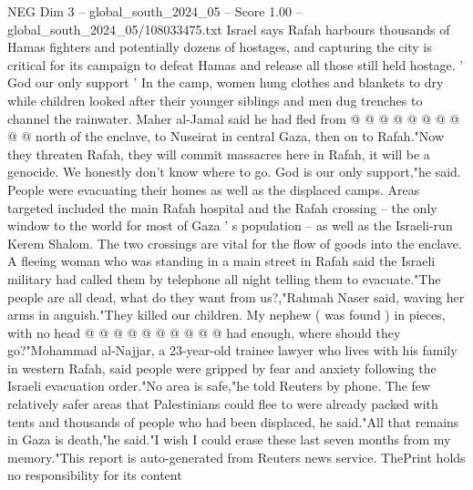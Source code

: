 \begin{textsample}{NEG Dim 3 – global\_south\_2024\_05 – Score 1.00 – global\_south\_2024\_05/108033475.txt}
Israel says Rafah harbours thousands of Hamas fighters and potentially dozens of hostages, and capturing the city is critical for its campaign to defeat Hamas and release all those still held hostage. ' God our only support ' In the camp, women hung clothes and blankets to dry while children looked after their younger siblings and men dug trenches to channel the rainwater.
Maher al-Jamal said he had fled from @ @ @ @ @ @ @ @ @ @ north of the enclave, to Nuseirat in central Gaza, then on to Rafah."Now they threaten Rafah, they will commit massacres here in Rafah, it will be a genocide.
We honestly don't know where to go.
God is our only support,"he said.
People were evacuating their homes as well as the displaced camps.
Areas targeted included the main Rafah hospital and the Rafah crossing -- the only window to the world for most of Gaza ' s population -- as well as the Israeli-run Kerem Shalom.
The two crossings are vital for the flow of goods into the enclave.
A fleeing woman who was standing in a main street in Rafah said the Israeli military had called them by telephone all night telling them to evacuate."The people are all dead, what do they want from us?,"Rahmah Naser said, waving her arms in anguish."They killed our children.
My nephew ( was found ) in pieces, with no head @ @ @ @ @ @ @ @ @ @ had enough, where should they go?"Mohammad al-Najjar, a 23-year-old trainee lawyer who lives with his family in western Rafah, said people were gripped by fear and anxiety following the Israeli evacuation order."No area is safe,"he told Reuters by phone.
The few relatively safer areas that Palestinians could flee to were already packed with tents and thousands of people who had been displaced, he said."All that remains in Gaza is death,"he said."I wish I could erase these last seven months from my memory."This report is auto-generated from Reuters news service.
ThePrint holds no responsibility for its content

\end{textsample}
